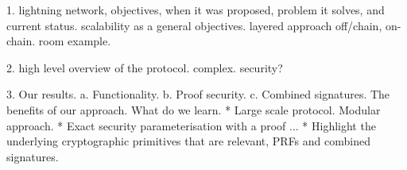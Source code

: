 
1. lightning network, objectives, when it was proposed, problem it solves, and current status. scalability as a general objectives. layered approach off/chain, on-chain. room example.


2. high level overview of the protocol. complex. security?

3. Our results.
a. Functionality.
b. Proof security.
c. Combined signatures.
The benefits of our approach.
What do we learn.
 * Large scale protocol. Modular approach.
 * Exact security parameterisation with a proof ...
 * Highlight the underlying cryptographic primitives that are relevant,
 PRFs  and combined signatures.
